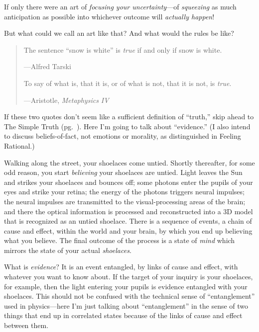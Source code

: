 {
 If only there were an art of \textit{focusing your
uncertainty}{}---of \textit{squeezing} as much anticipation as possible
into whichever outcome will \textit{actually happen}!}

{
 But what could we call an art like that? And what would the rules
be like?}

\myendsectiontext

\label{what_is_evidence}

\begin{quote}
{
 The sentence ``snow is white''
is \textit{true} if and only if snow is white.}

{\raggedleft
 {}---Alfred Tarski
\par}

{
 To say of what is, that it is, or of what is not, that it is not,
is \textit{true}.}

{\raggedleft
 {}---Aristotle, \textit{Metaphysics IV}
\par}
\end{quote}


{
 If these two quotes don't seem like a sufficient
definition of ``truth,'' skip ahead
to The Simple Truth (pg.\ \pageref{the_simple_truth}). Here I'm going to talk about
``evidence.'' (I also intend to
discuss beliefs-of-fact, not emotions or morality, as distinguished in
Feeling Rational.)}

{
 Walking along the street, your shoelaces come untied. Shortly
thereafter, for some odd reason, you start \textit{believing} your
shoelaces are untied. Light leaves the Sun and strikes your shoelaces
and bounces off; some photons enter the pupils of your eyes and strike
your retina; the energy of the photons triggers neural impulses; the
neural impulses are transmitted to the visual-processing areas of the
brain; and there the optical information is processed and reconstructed
into a 3D model that is recognized as an untied shoelace. There is a
sequence of events, a chain of cause and effect, within the world and
your brain, by which you end up believing what you believe. The final
outcome of the process is a state of \textit{mind} which mirrors the
state of your actual \textit{shoelaces}.}

{
 What is \textit{evidence}? It is an event entangled, by links of
cause and effect, with whatever you want to know about. If the target
of your inquiry is your shoelaces, for example, then the light entering
your pupils is evidence entangled with your shoelaces. This should not
be confused with the technical sense of
``entanglement'' used in
physics---here I'm just talking about
``entanglement'' in the sense of two
things that end up in correlated states because of the links of cause
and effect between them.}


